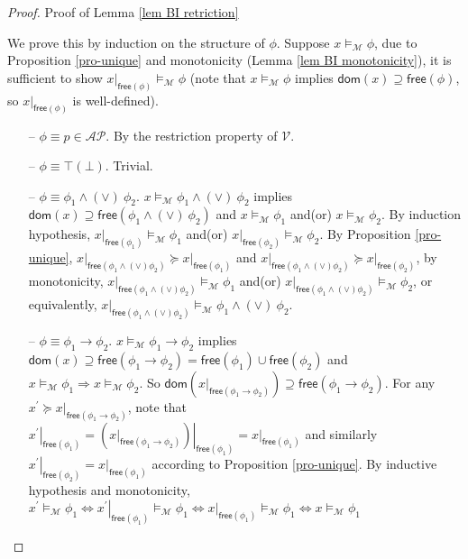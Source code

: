 \documentclass[conference,compsoc, 10pt]{IEEEtran}
\newcommand {\cM } {{\mathcal{M}}}
\newcommand {\cV } {{\mathcal{V}}}
\newcommand {\Ldom }[1] {{\mathsf{dom}\!\left(#1\right)}}
\newcommand {\Lfree }[1] {{\mathsf{free}{\left(#1\right)}}}
\newcommand {\rt }[2] {{\left.{#1}\right|_{#2}}}
\newcommand {\AP} {{\mathcal{AP}}}
\begin{document}
\begin{appendices}
\begin{proof}
			
			\vspace{0.2cm}
			
			\noindent Proof of Lemma \ref{lem BI retriction}
			
			\vspace{0.2cm}
			
			We prove this by induction on the structure of $\phi$. Suppose $x\models_\cM \phi$, due to Proposition \ref{pro-unique} and monotonicity (Lemma \ref{lem BI monotonicity}), it is sufficient to show $\rt{x}{\Lfree{\phi}}\models_\cM \phi$ (note that $x\models_\cM \phi$ implies $\Ldom{x}\supseteq\Lfree{\phi}$, so $\rt{x}{\Lfree{\phi}}$ is well-defined).
			\begin{enumerate}
				\item[--] $\phi \equiv p\in\AP.$ By the restriction property of $\cV$.
				\item[--] $\phi\equiv \top (\bot)$. Trivial.
				\item[--] $\phi \equiv \phi_1\wedge\!(\vee)\ \phi_2.$ $x\models_\cM \phi_1\wedge\!(\vee)\ \phi_2$ implies $\Ldom{x}\supseteq\Lfree{\phi_1\wedge\!(\vee)\ \phi_2}$ and $x\models_\cM \phi_1$ and(or) $x\models_\cM \phi_2$. By induction hypothesis, $\rt{x}{\Lfree{\phi_1}}\models_\cM \phi_1$ and(or) $\rt{x}{\Lfree{\phi_2}}\models_\cM \phi_2$. By Proposition \ref{pro-unique}, $\rt{x}{\Lfree{\phi_1\wedge(\vee) \phi_2}} \succeq \rt{x}{\Lfree{\phi_1}}$ and $\rt{x}{\Lfree{\phi_1\wedge(\vee) \phi_2}} \succeq \rt{x}{\Lfree{\phi_2}}$, by monotonicity, $\rt{x}{\Lfree{\phi_1\wedge(\vee) \phi_2}}\models_\cM \phi_1$ and(or) $\rt{x}{\Lfree{\phi_1\wedge(\vee) \phi_2}}\models_\cM \phi_2$, or equivalently, $\rt{x}{\Lfree{\phi_1\wedge(\vee) \phi_2}}\models_\cM \phi_1\wedge\!(\vee)\ \phi_2$.
				\item[--] $\phi \equiv \phi_1\rightarrow \phi_2.$ $x\models_\cM \phi_1\rightarrow \phi_2$ implies $\Ldom{x}\supseteq\Lfree{\phi_1\rightarrow\phi_2} = \Lfree{\phi_1}\cup\Lfree{\phi_2}$ and $x\models_\cM \phi_1\Rightarrow x\models_\cM \phi_2$. So $\Ldom{\rt{x}{\Lfree{\phi_1\rightarrow\phi_2}} }\supseteq\Lfree{\phi_1\rightarrow\phi_2}$.
				For any $x^\prime\succeq \rt{x}{\Lfree{\phi_1\rightarrow\phi_2}}$, note that $\rt{x^\prime}{\Lfree{\phi_1}} = \rt{\left(\rt{x}{\Lfree{\phi_1\rightarrow\phi_2}}\right)}{\Lfree{\phi_1}} = \rt{x}{\Lfree{\phi_1}}$ and similarly $\rt{x^\prime}{\Lfree{\phi_2}} = \rt{x}{\Lfree{\phi_1}}$ according to Proposition \ref{pro-unique}. By inductive hypothesis and monotonicity, $x^\prime\models_\cM \phi_1 \Leftrightarrow \rt{x^\prime}{\Lfree{\phi_1}}\models_\cM \phi_1 \Leftrightarrow \rt{x}{\Lfree{\phi_1}}\models_\cM \phi_1 \Leftrightarrow x\models_\cM \phi_1$

\end{enumerate}
\end{proof}
\end{appendices}
\end{document}
